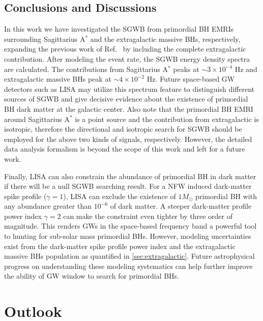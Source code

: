 \section{Conclusions and Discussions}\label{sec:PBH-EMRI-conclusion}

In this work we have investigated the \ac{SGWB} from primordial \ac{BH} \acp{EMRI} surrounding Sagittarius A$^\ast$ and the extragalactic massive \acp{BH}, respectively, expanding the previous work of Ref.~\cite{Kuhnel:2017bvu, SgrA} by including the complete extragalactic contribution.
After modeling the event rate, the \ac{SGWB} energy density spectra are calculated.
The contributions from Sagittarius A$^\ast$ peaks at $\sim 3\times 10^{-4}$ Hz and extragalactic massive \acp{BH} peak at $\sim 4\times 10^{-2}$ Hz.
Future space-based \ac{GW} detectors such as LISA may utilize this spectrum feature to distinguish different sources of \ac{SGWB} and give decisive evidence about the existence of primordial \ac{BH} dark matter at the galactic center.
Also note that the primordial \ac{BH} \ac{EMRI} around Sagittarius A$^\ast$ is a point source and the contribution from extragalactic is isotropic, therefore the directional and isotropic search for \ac{SGWB} \cite{SGWBlivingreview} should be employed for the above two kinds of signals, respectively.
However, the detailed data analysis formalism is beyond the scope of this work and left for a future work.

Finally, LISA can also constrain the abundance of primordial \ac{BH} in dark matter if there will be a null \ac{SGWB} searching result.
For a NFW induced dark-matter spike profile ($\gamma=1$), LISA can exclude the existence of $1 M_\odot$ primordial \ac{BH} with any abundance greater than $10^{-6}$ of dark matter.
A steeper dark-matter profile power index $\gamma=2$ can make the constraint even tighter by three order of magnitude.
This renders \acp{GW} in the space-based frequency band  a powerful tool to hunting for sub-solar mass primordial \acp{BH}.
However, modeling uncertainties exist from the dark-matter spike profile power index and the extragalactic massive \acp{BH} population as quantified in \cref{sec:extragalactic}.
Future astrophysical progress on understanding these modeling systematics can help further improve the ability of \ac{GW} window to search for primordial \acp{BH}.

\chapterend

\chapter{Outlook}\label{ch:outlook}

